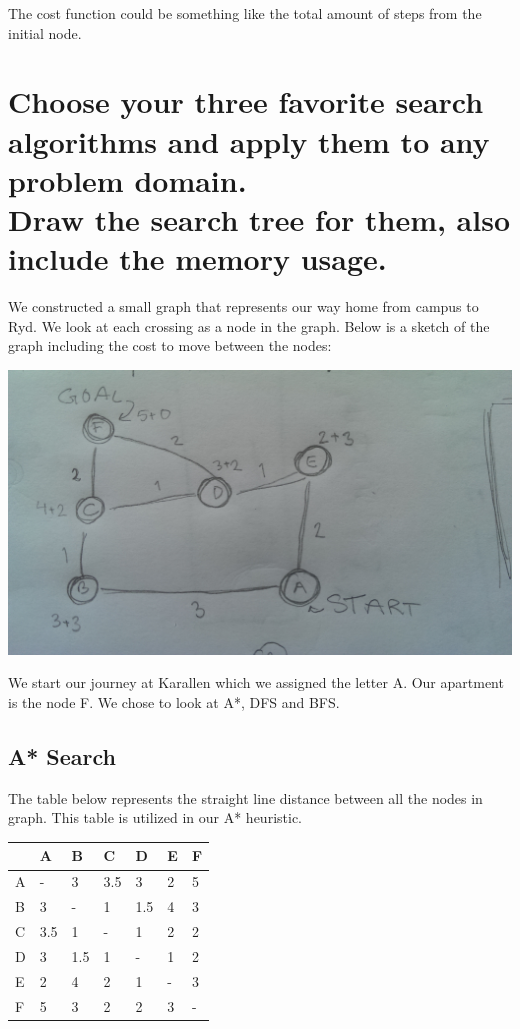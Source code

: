 \documentclass{article}
\begin{document}
The cost function could be something like the total amount of steps from the initial node.

\newpage

\section*{Choose your three favorite search algorithms and apply them to any problem domain.\\Draw the search tree for them, also include the memory usage.}

We constructed a small graph that represents our way home from campus to Ryd. We look at each crossing as a node in the graph.
Below is a sketch of the graph including the cost to move between the nodes:

\includegraphics[scale=0.1]{graph}

We start our journey at Karallen which we assigned the letter A. Our apartment is the node F. We chose to look at A*, DFS and BFS.

\subsection*{A* Search}

The table below represents the straight line distance between all the nodes in graph. This table is utilized in our A* heuristic.

\begin{center}
	\begin{table}[h]
		\begin{tabular}{|l|l|l|l|l|l|l|}
			\hline
			   & A 		& B 	& C 	& D 	& E 	& F \\
			\hline
			A  & - 		& 3 	& 3.5	& 3 	& 2 	& 5 \\
			\hline
			B  & 3 		& - 	& 1 	& 1.5 	& 4 	& 3 \\
			\hline
			C  & 3.5	& 1 	& - 	& 1 	& 2 	& 2 \\
			\hline
			D  & 3 		& 1.5 	& 1 	& - 	& 1 	& 2 \\
			\hline
			E  & 2 		& 4 	& 2 	& 1 	& -	 	& 3 \\
			\hline
			F  & 5 		& 3 	& 2 	& 2 	& 3 	& - \\
			\hline
		\end{tabular}
	\end{table}
\end{center}
\end{document}
